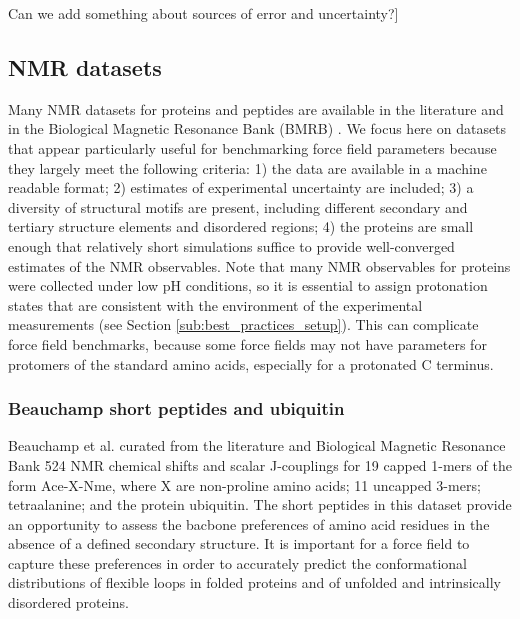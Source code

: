 \documentclass[9pt,review]{livecoms}
\begin{document}
Can we add something about sources of error and uncertainty?]

\subsection{NMR datasets}
\label{sub:nmr_data}

Many NMR datasets for proteins and peptides are available in the literature and in the Biological Magnetic Resonance Bank (BMRB) \cite{ulrich_biomagresbank_2008,romero_biomagresbank_2020}.
We focus here on datasets that appear particularly useful for benchmarking force field parameters because they largely meet the following criteria: 1) the data are available in a machine readable format; 2) estimates of experimental uncertainty are included; 3) a diversity of structural motifs are present, including different secondary and tertiary structure elements and disordered regions; 4) the proteins are small enough that relatively short simulations suffice to provide well-converged estimates of the NMR observables.
Note that many NMR observables for proteins were collected under low pH conditions, so it is essential to assign protonation states that are consistent with the environment of the experimental measurements (see Section \ref{sub:best_practices_setup}).
This can complicate force field benchmarks, because some force fields may not have parameters for protomers of the standard amino acids, especially for a protonated C terminus.

\subsubsection{Beauchamp short peptides and ubiquitin}
\label{sub2:beauchamp}

Beauchamp et al. \cite{beauchamp_are_2012} curated from the literature and Biological Magnetic Resonance Bank 524 NMR chemical shifts and scalar J-couplings for 19 capped 1-mers of the form Ace-X-Nme, where X are non-proline amino acids; 11 uncapped 3-mers; tetraalanine; and the protein ubiquitin.
The short peptides in this dataset provide an opportunity to assess the bacbone preferences of amino acid residues in the absence of a defined secondary structure.
It is important for a force field to capture these preferences in order to accurately predict the conformational distributions of flexible loops in folded proteins and of unfolded and intrinsically disordered proteins.
\end{document}
